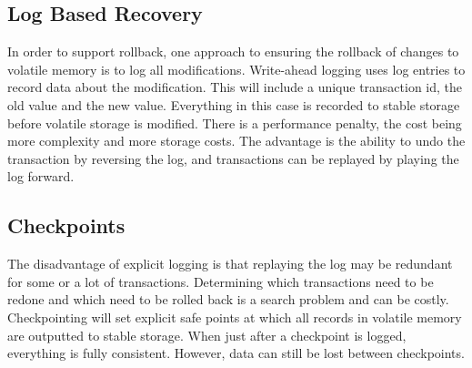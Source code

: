\documentclass[10pt,a4paper]{article}
\begin{document}
\subsection{Log Based Recovery}
In order to support rollback, one approach to ensuring the rollback of changes to volatile memory is to log all modifications. Write-ahead logging uses log entries to record data about the modification. This will include a unique transaction id, the old value and the new value. Everything in this case is recorded to stable storage before volatile storage is modified. There is a performance penalty, the cost being more complexity and more storage costs. The advantage is the ability to undo the transaction by reversing the log, and transactions can be replayed  by playing the log forward. 
\subsection{Checkpoints}
The disadvantage of explicit logging is that replaying the log may be redundant for some or a lot of transactions. Determining which transactions need to be redone and which need to be rolled back is a search problem and can be costly. Checkpointing will set explicit safe points at which all records in volatile memory are outputted to stable storage. When just after a checkpoint is logged, everything is fully consistent. However, data can still be lost between checkpoints. 
\end{document}
